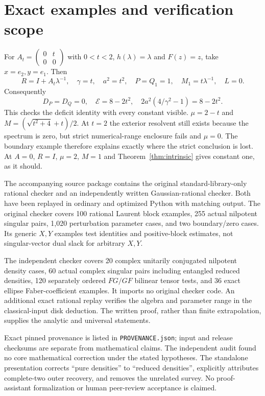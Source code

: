 \documentclass[11pt]{article}
\theoremstyle{remark}\newtheorem{remark}[theorem]{Remark}
\begin{document}
\section{Exact examples and verification scope}
For $A_t=\left(\begin{smallmatrix}0&t\\0&0\end{smallmatrix}\right)$ with $0<t<2$, $h(\lambda)=\lambda$ and $F(z)=z$, take $x=e_2,y=e_1$. Then
\[R=I+A_t\lambda^{-1},\quad \gamma=t,\quad a^2=t^2,\quad
P=Q_1=1,\quad M_1=t\lambda^{-1},\quad L=0.
\]
Consequently
\[D_P=D_Q=0,\quad\mathcal E=8-2t^2,
\quad 2a^2(4/\gamma^2-1)=8-2t^2.
\]
This checks the deficit identity with every constant visible. $\mu=2-t$ and
$M=(\sqrt{t^2+4}+t)/2$. At $t=2$ the exterior resolvent still exists because the spectrum is zero, but strict numerical-range enclosure fails and $\mu=0$. The boundary example therefore explains exactly where the strict conclusion is lost. At $A=0$, $R=I$, $\mu=2$, $M=1$ and Theorem~\ref{thm:intrinsic} gives constant one, as it should.

The accompanying source package contains the original standard-library-only rational checker and an independently written Gaussian-rational checker. Both have been replayed in ordinary and optimized Python with matching output. The original checker covers 100 rational Laurent block examples, 255 actual nilpotent singular pairs, 1,020 perturbation parameter cases, and two boundary/zero cases. Its generic $X,Y$ examples test identities and positive-block estimates, not singular-vector dual slack for arbitrary $X,Y$.

The independent checker covers 20 complex unitarily conjugated nilpotent density cases, 60 actual complex singular pairs including entangled reduced densities, 120 separately ordered $FG/GF$ bilinear tensor tests, and 36 exact ellipse Faber-coefficient examples. It imports no original checker code. An additional exact rational replay verifies the algebra and parameter range in the classical-input disk deduction. The written proof, rather than finite extrapolation, supplies the analytic and universal statements.

Exact pinned provenance is listed in \texttt{PROVENANCE.json}; input and release checksums are separate from mathematical claims. The independent audit found no core mathematical correction under the stated hypotheses. The standalone presentation corrects ``pure densities'' to ``reduced densities'', explicitly attributes complete-two outer recovery, and removes the unrelated survey. No proof-assistant formalization or human peer-review acceptance is claimed.
\end{document}
